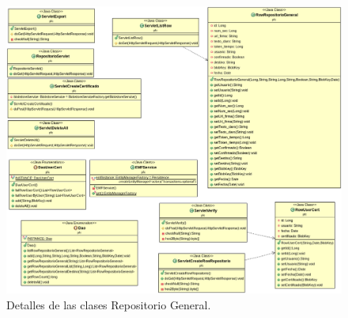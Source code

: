 \begin{figure}[h]
  \centering
    \includegraphics[scale=0.4]{./GoogleAppEngine/imagenes/UML_repositorio.png}
  \caption{Detalles de las clases Repositorio General.}
  \label{fig:clasesReposotorioGeneral}
\end{figure}

